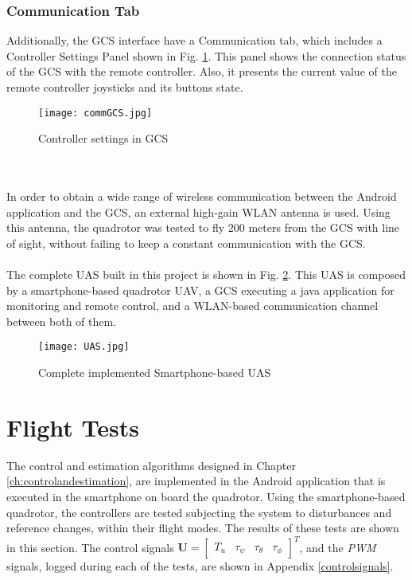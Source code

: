 \subsubsection*{Communication Tab}
Additionally, the GCS interface have a Communication tab, which includes a Controller Settings Panel shown in Fig. \ref{fig:commGCS}. This panel shows the connection status of the GCS with the remote controller. Also, it presents the current value of the remote controller joysticks and its buttons state.
\begin{figure}[h]
\begin{center}
\texttt{[image: commGCS.jpg]}  
\caption{Controller settings in GCS} 
\label{fig:commGCS}
\end{center}
\end{figure}
\\\\
In order to obtain a wide range of wireless communication between the Android application and the GCS, an external high-gain WLAN antenna is used. Using this antenna, the quadrotor was tested to fly $200$ meters from the GCS with line of sight, without failing to keep a constant communication with the GCS.
\\\\
The complete UAS built in this project is shown in Fig. \ref{fig:UAS}. This UAS is composed by a smartphone-based quadrotor UAV, a GCS executing a java application for monitoring and remote control, and a WLAN-based communication channel between both of them.
\begin{figure}[h]
\begin{center}
\texttt{[image: UAS.jpg]}  
\caption{Complete implemented Smartphone-based UAS} 
\label{fig:UAS}
\end{center}
\end{figure}
\vspace{-1.5cm}
\section{Flight Tests} \label{sec:tests}
The control and estimation algorithms designed in Chapter \ref{ch:controlandestimation}, are implemented in the Android application that is executed in the smartphone on board the quadrotor. Using the smartphone-based quadrotor, the controllers are tested subjecting the system to disturbances and reference changes, within their flight modes. The results of these tests are shown in this section. The control signals $\mathbf{U} = \begin{bmatrix}
T_u & \tau_\psi & \tau_\theta & \tau_\phi
\end{bmatrix}^{T}$, and the \textit{PWM} signals, logged during each of the tests, are shown in Appendix \ref{controlsignals}.

